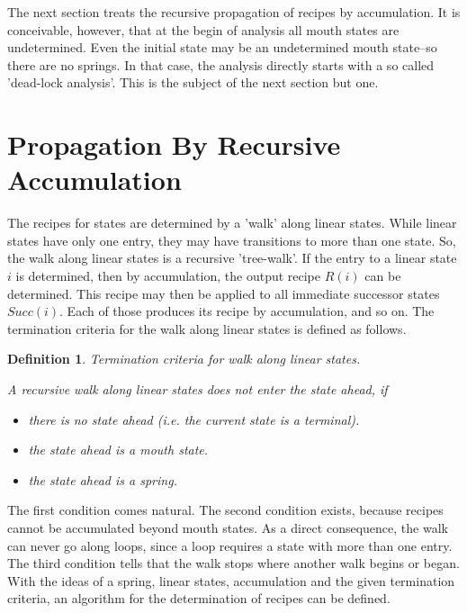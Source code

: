 \documentclass[12pt,a4paper]{scrartcl}
\newtheorem{definition}{Definition}
\begin{document}
The next section treats the recursive propagation of recipes by accumulation.
It is conceivable, however, that at the begin of analysis all mouth states are
undetermined. Even the initial state may be an undetermined mouth state--so
there are no springs. In that case, the analysis directly starts with a so
called 'dead-lock analysis'. This is the subject of the next section but one.

%
\section{Propagation By Recursive Accumulation}

The recipes for states are determined by a 'walk' along linear states. While
linear states have only one entry, they may have transitions to more than one
state. So, the walk along linear states is a recursive 'tree-walk'. If the
entry to a linear state $i$ is determined, then by accumulation, the output
recipe $R(i)$ can be determined. This recipe may then be applied to all
immediate successor states $Succ(i)$. Each of those produces its recipe by
accumulation, and so on. The termination criteria for the walk along linear
states is defined as follows.

\begin{definition}
Termination criteria for walk along linear states.

A recursive walk along linear states does not enter the state ahead, if 

\begin{itemize}
    \item there is no state ahead (i.e. the current state is a terminal).
    \item the state ahead is a mouth state.
    \item the state ahead is a spring.
\end{itemize}
\end{definition}

The first condition comes natural. The second condition exists, because recipes
cannot be accumulated beyond mouth states. As a direct consequence, the walk
can never go along loops, since a loop requires a state with more than one
entry. The third condition tells that the walk stops where another walk begins
or began.  With the ideas of a spring, linear states, accumulation and the
given termination criteria, an algorithm for the determination of recipes can
be defined.
\end{document}

